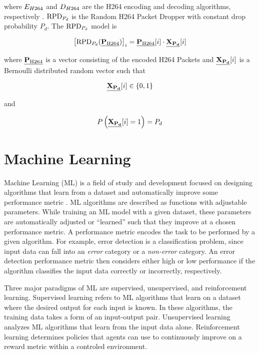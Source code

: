 \def\ph264{\text{P}_{\text{H264}}}

where $E_{H264}$ and $D_{H264}$ are the H264 encoding and decoding algorithms, respectively \cite{h264}. $\text{RPD}_{P_d}$ is the Random H264 Packet Dropper with constant drop probability $P_d$. The $\text{RPD}_{P_d}$ model is

\def\H264PV{\vct{P_\text{H264}}}
\def\XPD{\vct{X_{P_d}}}
\begin{equation}
  \label{eq:RPD}
  \left[\RPD(\H264PV)\right]_{i} = \H264PV[i]\cdot\XPD[i]
\end{equation}

where $\H264PV$ is a vector consisting of the encoded H264 Packets and $\XPD[i]$ is a Bernoulli distributed random vector such that

\begin{equation}
  \label{eq:XPDSET}
  \XPD[i] \in \{0,1\}
\end{equation}

and

\begin{equation}
  \label{eq:XPDPROB}
  P\left(\XPD[i]=1\right)=P_d
\end{equation}

\section{Machine Learning}
\label{sec:classicalML}

Machine Learning (ML) is a field of study and development focused on designing algorithms that learn from a dataset and automatically improve some performance metric \cite{Jordan2015}. ML algorithms are described as functions with adjustable parameters. While training an ML model with a given dataset, these parameters are automatically adjusted or ``learned'' such that they improve at a chosen performance metric. A performance metric encodes the task to be performed by a given algorithm. For example, error detection is a classification problem, since input data can fall into an \emph{error} category or a \emph{non-error} category. An error detection performance metric then considers either high or low performance if the algorithm classifies the input data correctly or incorrectly, respectively.

Three major paradigms of ML are supervised, unsupervised, and reinforcement learning. Supervised learning refers to ML algorithms that learn on a dataset where the desired output for each input is known. In these algorithms, the training data takes a form of an input-output pair. Unsupervised learning analyzes ML algorithms that learn from the input data alone. Reinforcement learning determines policies that agents can use to continuously improve on a reward metric within a controled environment.

